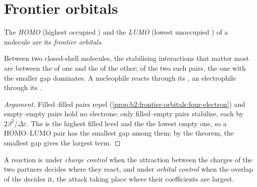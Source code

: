 \section{Frontier orbitals}

\begin{definition}\label{def:b2:frontier-orbitals:frontier}
The \emph{HOMO} (highest occupied ) and the
\emph{LUMO} (lowest unoccupied ) of a molecule are its
\emph{frontier orbitals}.
\end{definition}

\begin{proposition}\label{prop:b2:frontier-orbitals:dominant}
Between two closed-shell molecules, the stabilising interactions that matter most
are between the  of one and the  of the other; of the two such pairs, the one
with the smaller gap dominates. A nucleophile reacts through its , an
electrophile through its .
\end{proposition}

\begin{proof}[Argument]
Filled--filled pairs repel (\cref{prop:b2:frontier-orbitals:four-electron}) and empty--empty
pairs hold no electrons: only filled--empty pairs stabilise, each by $2\beta^2/\Delta\varepsilon$.
The  is the highest filled level and the  the lowest empty one, so a
HOMO--LUMO pair has the smallest gap among them; by the theorem, the smallest gap
gives the largest term.
\end{proof}

\begin{definition}\label{def:b2:frontier-orbitals:control}
A reaction is under \emph{charge control} when the attraction
between the charges of the two partners decides where they react, and under
\emph{orbital control} when the overlap of the 
decides it, the attack taking place where their coefficients are largest.
\end{definition}


